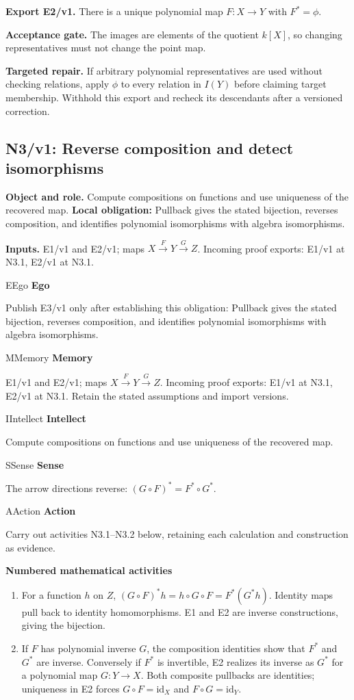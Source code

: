 \documentclass[preprint,12pt,aps,pra,showkeys,amsmath,amssymb,superscriptaddress,floatfix]{revtex4-2}
\theoremstyle{definition}
\theoremstyle{remark}
\newcommand{\mmfaculty}[3]{%
 \begin{mmfacultybox}{#1}{#2}
 {\sffamily\bfseries\color{MMBlue}#2}\par\smallskip #3
 \end{mmfacultybox}}
\newcommand{\field}[2]{\par\smallskip\noindent\textbf{#1.} #2\par}
\begin{document}
\field{Export E2/v1}{There is a unique polynomial map \(F:X\to Y\) with \(F^*=\phi\).}

\field{Acceptance gate}{The images are elements of the quotient \(k[X]\), so changing
representatives must not change the point map.}

\field{Targeted repair}{If arbitrary polynomial representatives are used without checking
relations, apply \(\phi\) to every relation in \(I(Y)\) before claiming
target membership. Withhold this export and recheck its descendants
after a versioned correction.}

\clearpage

\subsection{N3/v1: Reverse composition and detect isomorphisms}

\field{Object and role}{Compute compositions on functions and use uniqueness of the recovered
map. \textbf{Local obligation:} Pullback gives the stated bijection,
reverses composition, and identifies polynomial isomorphisms with
algebra isomorphisms.}

\field{Inputs}{E1/v1 and E2/v1; maps \(X\xrightarrow{F}Y\xrightarrow{G}Z\). Incoming
proof exports: E1/v1 at N3.1, E2/v1 at N3.1.}

\mmfaculty{E}{Ego}{Publish E3/v1 only after establishing this obligation: Pullback gives
the stated bijection, reverses composition, and identifies polynomial
isomorphisms with algebra isomorphisms.}

\mmfaculty{M}{Memory}{E1/v1 and E2/v1; maps \(X\xrightarrow{F}Y\xrightarrow{G}Z\). Incoming
proof exports: E1/v1 at N3.1, E2/v1 at N3.1. Retain the stated
assumptions and import versions.}

\mmfaculty{I}{Intellect}{Compute compositions on functions and use uniqueness of the recovered
map.}

\mmfaculty{S}{Sense}{The arrow directions reverse: \((G\circ F)^*=F^*\circ G^*\).}

\mmfaculty{A}{Action}{Carry out activities N3.1--N3.2 below, retaining each calculation and
construction as evidence.}

\smallskip\noindent\textbf{Numbered mathematical activities}

\begin{enumerate}[label=N3.\arabic*,leftmargin=3.4em]

\item For a function \(h\) on \(Z\),
\((G\circ F)^*h=h\circ G\circ F=F^*(G^*h)\). Identity maps pull back to
identity homomorphisms. E1 and E2 are inverse constructions, giving the
bijection.

\item If \(F\) has polynomial inverse \(G\), the composition identities show
that \(F^*\) and \(G^*\) are inverse. Conversely if \(F^*\) is
invertible, E2 realizes its inverse as \(G^*\) for a polynomial map
\(G:Y\to X\). Both composite pullbacks are identities; uniqueness in E2
forces \(G\circ F=\mathrm{id}_X\) and \(F\circ G=\mathrm{id}_Y\).

\end{enumerate}
\end{document}
